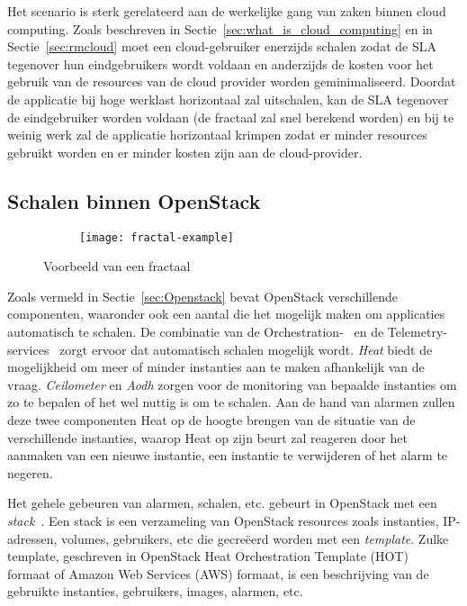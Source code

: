 Het scenario is sterk gerelateerd aan de werkelijke gang van zaken binnen cloud computing. Zoals beschreven in Sectie~\ref{sec:what_is_cloud_computing} en in Sectie~\ref{sec:rmcloud} moet een cloud-gebruiker enerzijds schalen zodat de SLA tegenover hun eindgebruikers wordt voldaan en anderzijds de kosten voor het gebruik van de resources van de cloud provider worden geminimaliseerd. Doordat de applicatie bij hoge werklast horizontaal zal uitschalen, kan de SLA tegenover de eindgebruiker worden voldaan (de fractaal zal snel berekend worden) en bij te weinig werk zal de applicatie horizontaal krimpen zodat er minder resources gebruikt worden en er minder kosten zijn aan de cloud-provider.

\subsection{Schalen binnen OpenStack}

\begin{figure}
  \centering
  \captionsetup{justification=centering}
  \begin{subfigure}{\textwidth}
    \centering
    \centerline{
      \texttt{[image: fractal-example]}
    }
  \end{subfigure}
  \caption{Voorbeeld van een fractaal}
  \label{fig:fractal}
\end{figure}

Zoals vermeld in Sectie~\ref{sec:Openstack} bevat OpenStack verschillende  componenten, waaronder ook een aantal die het mogelijk maken om applicaties automatisch te schalen. De combinatie van de Orchestration-~\cite{OpenStack2017g} en de Telemetry-services~\cite{OpenStack2017h} zorgt ervoor dat automatisch schalen mogelijk wordt. \textit{Heat} biedt de mogelijkheid om meer of minder instanties aan te maken afhankelijk van de vraag. \textit{Ceilometer} en \textit{Aodh} zorgen voor de monitoring van bepaalde instanties om zo te bepalen of het wel nuttig is om te schalen. Aan de hand van alarmen zullen deze twee componenten Heat op de hoogte brengen van de situatie van de verschillende instanties, waarop Heat op zijn beurt zal reageren door het aanmaken van een nieuwe instantie, een instantie te verwijderen of het alarm te negeren.

Het gehele gebeuren van alarmen, schalen, etc. gebeurt in OpenStack met een \textit{stack}~\cite{OpenStack2017i}. Een stack is een verzameling van OpenStack resources zoals instanties, IP-adressen, volumes, gebruikers, etc die gecreëerd worden met een \textit{template}. Zulke template, geschreven in OpenStack Heat Orchestration Template (HOT)~\cite{OpenStack2017f} formaat of Amazon Web Services (AWS) formaat, is een beschrijving van de gebruikte instanties, gebruikers, images, alarmen, etc.

